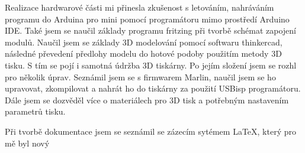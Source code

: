 \documentclass[11pt,a4paper,twoside,openright]{report}
\let\openright=\cleardoublepage
\begin{document}
	
	Realizace hardwarové části mi přinesla zkušenost s letováním, nahráváním programu do Arduina pro mini pomocí programátoru mimo prostředí Arduino IDE. Také jsem se naučil základy programu fritzing při tvorbě schémat zapojení modulů. Naučil jsem se základy 3D modelování pomocí softwaru thinkercad, následné převedení předlohy modelu do hotové podoby použitím metody 3D tisku. S tím se pojí i samotná údržba 3D tiskárny. Po jejím složení jsem se rozhl pro několik úprav. Seznámil jsem se s firmwarem Marlin, naučil jsem se ho upravovat, zkompilovat a nahrát ho do tiskárny za použití USBisp programátoru. Dále jsem se dozvěděl více o materiálech pro 3D tisk a potřebným nastavením parametrů tisku.
	
	
	Při tvorbě dokumentace jsem se seznámil se zázecím sytémem \LaTeX, který pro mě byl nový 
	
	\nocite{einstein}\nocite{maly}\nocite{knuthwebsite}\nocite{ucebnice}\nocite{polovodicovatechnika}\nocite{šrait}\nocite{techtutorials}
	\printbibliography[title={Seznam použité literatury},heading={bibintoc}]
	
	\openright
	\listoffigures
	
	\clearpage
	\listoftables
	
	
	
\end{document}
